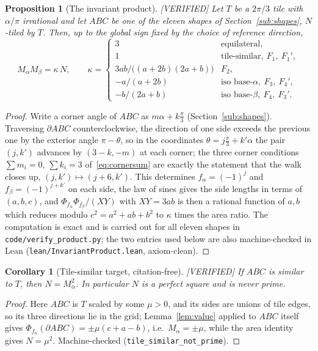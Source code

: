 \documentclass[11pt,reqno]{amsart}
\theoremstyle{plain}
\newtheorem{corollary}[theorem]{Corollary}
\newtheorem{proposition}[theorem]{Proposition}
\theoremstyle{definition}
\newcommand{\lab}[1]{\hfill\textnormal{\footnotesize\textsc{[#1]}}}
\begin{document}
\begin{proposition}[The invariant product]\label{prop:product}\lab{VERIFIED}
Let $T$ be a $2\pi/3$ tile with $\alpha/\pi$ irrational and let $ABC$ be one of the eleven shapes of
Section~\ref{sub:shapes}, $N$-tiled by $T$. Then, up to the global sign fixed by the choice of
reference direction,
\[
M_\alpha M_\beta=\kappa\,N,\qquad
\kappa=\begin{cases}
3 & \text{equilateral},\\
1 & \text{tile-similar},\ F_1,\ F_1',\\
3ab/\bigl((a+2b)(2a+b)\bigr) & F_2,\\
-a/(a+2b) & \text{iso base-}\alpha,\ F_3,\ F_4',\\
-b/(2a+b) & \text{iso base-}\beta,\ F_4,\ F_3'.
\end{cases}
\]
\end{proposition}

\begin{proof}
Write a corner angle of $ABC$ as $m\alpha+k\frac\pi3$ (Section~\ref{sub:shapes}). Traversing
$\partial ABC$ counterclockwise, the direction of one side exceeds the previous one by the exterior
angle $\pi-\theta$, so in the coordinates $\theta=j\frac\pi3+k'\alpha$ the pair $(j,k')$ advances by
$(3-k,-m)$ at each corner; the three corner conditions $\sum m_i=0$, $\sum k_i=3$
of~\eqref{eq:cornersum} are exactly the statement that the walk closes up, $(j,k')\mapsto(j+6,k')$.
This determines $f_\alpha=(-1)^j$ and $f_\beta=(-1)^{j+k'}$ on each side, the law of sines gives the
side lengths in terms of $(a,b,c)$, and $\Phi_{f_\alpha}\Phi_{f_\beta}/(XY)$ with $XY=3ab$ is then a
rational function of $a,b$ which reduces modulo $c^2=a^2+ab+b^2$ to $\kappa$ times the area ratio.
The computation is exact and is carried out for all eleven shapes in
\texttt{code/verify\_product.py}; the two entries used below are also machine-checked in Lean
(\texttt{lean/InvariantProduct.lean}, axiom-clean).
\end{proof}

\begin{corollary}[Tile-similar target, citation-free]\label{cor:similar}\lab{VERIFIED}
If $ABC$ is similar to $T$, then $N=M_\alpha^2$. In particular $N$ is a perfect square and is never
prime.
\end{corollary}

\begin{proof}
Here $ABC$ is $T$ scaled by some $\mu>0$, and its sides are unions of tile edges, so its three
directions lie in the grid; Lemma~\ref{lem:value} applied to $ABC$ itself gives
$\Phi_{f_\alpha}(\partial ABC)=\pm\mu(c+a-b)$, i.e.\ $M_\alpha=\pm\mu$, while the area identity gives
$N=\mu^2$. Machine-checked (\texttt{tile\_similar\_not\_prime}).
\end{proof}
\end{document}
